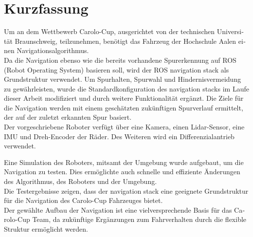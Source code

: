 \chapter*{Kurzfassung}
\label{kurzfassung}

\begin{otherlanguage}{ngerman}
Um an dem Wettbewerb Carolo-Cup, ausgerichtet von der technischen Universität Braunschweig, teilzunehmen, benötigt das Fahrzeug der Hochschule Aalen einen Navigationsalgorithmus.\\

Da die Navigation ebenso wie die bereits vorhandene Spurerkennung auf ROS (Robot Operating System) basieren soll, wird der ROS navigation stack als Grundstruktur verwendet. Um Spurhalten, Spurwahl und Hindernisvermeidung zu gewährleisten, wurde die Standardkonfiguration des navigation stacks im Laufe dieser Arbeit modifiziert und durch weitere Funktionalität ergänzt. Die Ziele für die Navigation werden mit einem geschätzten zukünftigen Spurverlauf ermittelt, der auf der zuletzt erkannten Spur basiert.\\

Der vorgeschriebene Roboter verfügt über eine Kamera, einen Lidar-Sensor, eine IMU und Dreh-Encoder der Räder. Des Weiteren wird ein Differenzialantrieb verwendet.

Eine Simulation des Roboters, mitsamt der Umgebung wurde aufgebaut, um die Navigation zu testen. Dies ermöglichte auch schnelle und effiziente Änderungen des Algorithmus, des Roboters und der Umgebung.\\

Die Testergebnisse zeigen, dass der navigation stack eine geeignete Grundstruktur für die Navigation des Carolo-Cup Fahrzeuges bietet.\\

Der gewählte Aufbau der Navigation ist eine vielversprechende Basis für das Carolo-Cup Team, da zukünftige Ergänzungen zum Fahrverhalten durch die flexible Struktur ermöglicht werden.
\end{otherlanguage}
